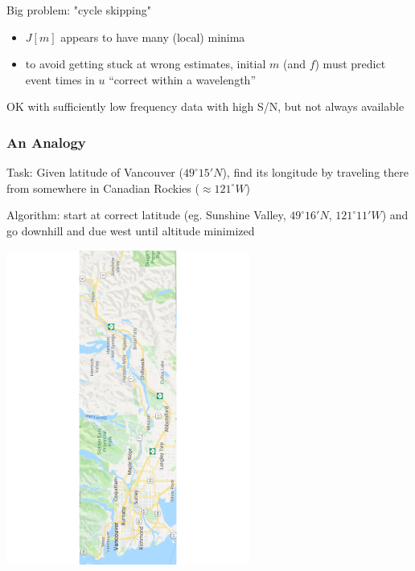 \documentclass[xcolor=dvipsnames,12pt,aspectratio=169]{beamer}
\begin{document}
\begin{frame}
Big problem: "cycle skipping"
\begin{itemize}
\item $J[m]$ appears to have many (local) minima
\item to avoid getting stuck at wrong estimates, initial $m$ (and $f$) must predict event times in $u$ ``correct within a wavelength''
\end{itemize}

OK with sufficiently low frequency data with high S/N, but not always available
\end{frame}

\begin{frame}\frametitle{An Analogy}
Task: Given latitude of Vancouver ($49^{\circ} 15' N$), find its longitude by traveling there from somewhere in Canadian Rockies ($\approx 121^{\circ} W$)

Algorithm: start at correct latitude (eg. Sunshine Valley, $49^{\circ} 16' N$, $121^{\circ} 11' W$) and go {\color{blue} downhill and due west} until altitude minimized 
\vspace{-3cm}
\begin{center}
\includegraphics[width=0.6\textwidth,angle=270]{Fig/bc.pdf}
\end{center}
\vspace{-3cm}
\end{frame}
\end{document}
